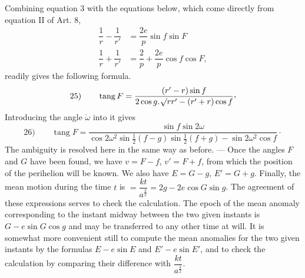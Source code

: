 Combining equation 3 with the equations below, which come directly from equation II of Art. 8,
\[
\begin{aligned}
\dfrac1r-\dfrac1{r'}&=\dfrac{2e}{p}\sin f\sin F\\[6pt]
\dfrac1r+\dfrac1{r'}&=\dfrac2p+\dfrac{2e}{p}\cos f\cos F,
\end{aligned}
\]
readily gives the following formula.
\[
\mathrm{25)}\qquad \operatorname{tang}F=\dfrac{(r'-r)\sin f}{2\cos g\mathpunct{.}\BareRoot{rr'}-(r'+r)\cos f}\mathpunct{\raisebox{.45ex}{,}}
\]
Introducing the angle $\grave{\omega}$ into it gives
\[
\mathrm{26)}\qquad \operatorname{tang}F=\dfrac{\sin f\sin 2\omega}{\cos 2\omega^2\sin\frac12(f-g)\sin\frac12(f+g)-\sin 2\omega^2\cos f}\mathpunct{\cdot}
\]
The ambiguity is resolved here in the same way as before. — Once the angles $F$ and $G$ have been found, we have $v=F-f$, $v'=F+f$, from which the position of the perihelion will be known. We also have $E=G-g$, $E'=G+g$. Finally, the mean motion during the time $t$ is $=\dfrac{kt}{a^{\frac32}}=2g-2e\cos G\sin g$. The agreement of these expressions serves to check the calculation. The epoch of the mean anomaly corresponding to the instant midway between the two given instants is $G-e\sin G\cos g$ and may be transferred to any other time at will. It is somewhat more convenient still to compute the mean anomalies for the two given instants by the formulas $E-e\sin E$ and $E'-e\sin E'$, and to check the calculation by comparing their difference with $\dfrac{kt}{a^{\frac32}}$.
